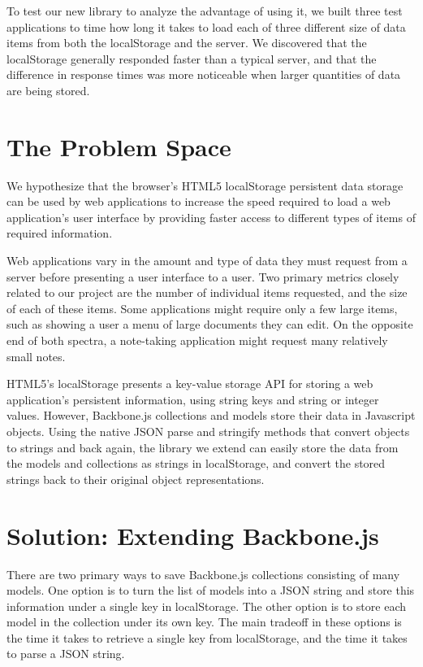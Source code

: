 \documentclass[12pt]{article}
\begin{document}
To test our new library to analyze the advantage of using it, we built three
test applications to time how long it takes to load each of three different
size of data items from both the localStorage and the server. We discovered
that the localStorage generally responded faster than a typical server, and
that the difference in response times was more noticeable when larger
quantities of data are being stored.

\section{The Problem Space}

We hypothesize that the browser's HTML5 localStorage persistent data storage
can be used by web applications to increase the speed required to load a web
application's user interface by providing faster access to different types of
items of required information.

Web applications vary in the amount and type of data they must request from a
server before presenting a user interface to a user. Two primary metrics
closely related to our project are the number of individual items requested,
and the size of each of these items. Some applications might require only a few
large items, such as showing a user a menu of large documents they can edit. On
the opposite end of both spectra, a note-taking application might request many
relatively small notes.

HTML5's localStorage presents a key-value storage API for storing a web
application's persistent information, using string keys and string or integer
values. However, Backbone.js collections and models store their data in
Javascript objects. Using the native JSON parse and stringify methods that
convert objects to strings and back again, the library we extend can easily
store the data from the models and collections as strings in localStorage, and
convert the stored strings back to their original object representations.

\section{Solution: Extending Backbone.js}

There are two primary ways to save Backbone.js collections consisting of many
models. One option is to turn the list of models into a JSON string and store
this information under a single key in localStorage. The other option is to
store each model in the collection under its own key. The main tradeoff in
these options is the time it takes to retrieve a single key from localStorage,
and the time it takes to parse a JSON string.
\end{document}
